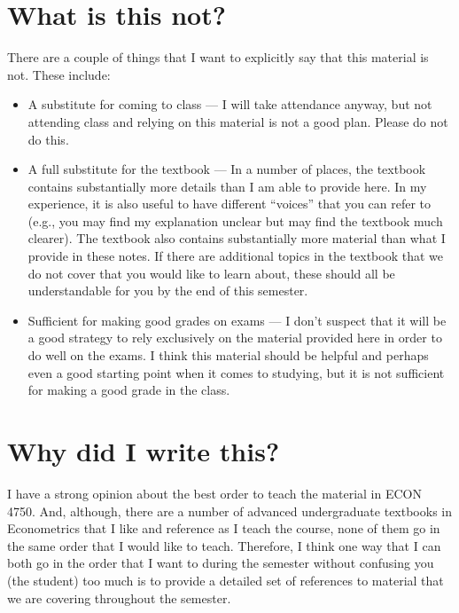 \documentclass[
  letterpaper,
  DIV=11,
  numbers=noendperiod]{scrreprt}
\begin{document}
\section{What is this not?}\label{what-is-this-not}

There are a couple of things that I want to explicitly say that this
material is not. These include:

\begin{itemize}
\item
  A substitute for coming to class --- I will take attendance anyway,
  but not attending class and relying on this material is not a good
  plan. Please do not do this.
\item
  A full substitute for the textbook --- In a number of places, the
  textbook contains substantially more details than I am able to provide
  here. In my experience, it is also useful to have different ``voices''
  that you can refer to (e.g., you may find my explanation unclear but
  may find the textbook much clearer). The textbook also contains
  substantially more material than what I provide in these notes. If
  there are additional topics in the textbook that we do not cover that
  you would like to learn about, these should all be understandable for
  you by the end of this semester.
\item
  Sufficient for making good grades on exams --- I don't suspect that it
  will be a good strategy to rely exclusively on the material provided
  here in order to do well on the exams. I think this material should be
  helpful and perhaps even a good starting point when it comes to
  studying, but it is not sufficient for making a good grade in the
  class.
\end{itemize}

\section{Why did I write this?}\label{why-did-i-write-this}

I have a strong opinion about the best order to teach the material in
ECON 4750. And, although, there are a number of advanced undergraduate
textbooks in Econometrics that I like and reference as I teach the
course, none of them go in the same order that I would like to teach.
Therefore, I think one way that I can both go in the order that I want
to during the semester without confusing you (the student) too much is
to provide a detailed set of references to material that we are covering
throughout the semester.
\end{document}
